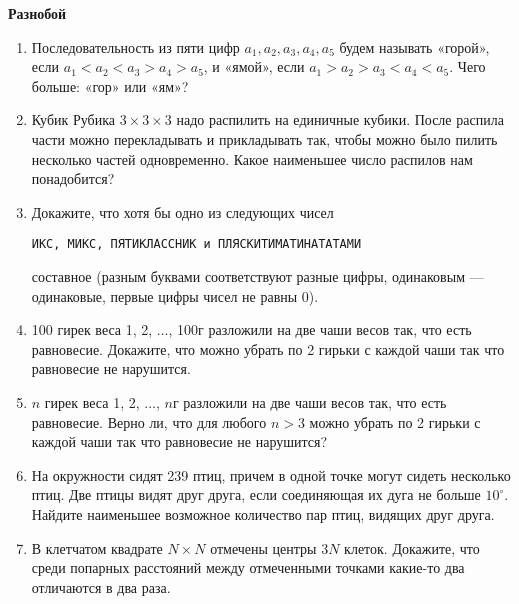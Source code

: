 \documentclass{article}
\begin{document}
\large
	

\begin{center}
\textbf{Разнобой}
\end{center}

\begin{enumerate}[label*=\protect\fbox{\arabic{enumi}}]
	
	\item Последовательность из пяти цифр $a_1, a_2, a_3, a_4, a_5$ будем называть «горой», если $a_1 < a_2 < a_3 > a_4 > a_5$, и «ямой», если $a_1 > a_2 > a_3 < a_4 < a_5$. Чего больше: «гор» или
	«ям»?
	
	\item Кубик Рубика $3 \times 3 \times 3$ надо распилить на единичные кубики. После распила части
	можно перекладывать и прикладывать так, чтобы можно было пилить несколько
	частей одновременно. Какое наименьшее число распилов нам понадобится?
	
	\item Докажите, что хотя бы одно из следующих чисел 
	\begin{center}
		 \texttt{ИКС, МИКС, ПЯТИКЛАССНИК и ПЛЯСКИТИМАТИНАТАТАМИ}
	\end{center}
	 составное (разным буквами соответствуют разные цифры, одинаковым — одинаковые, первые цифры чисел не равны 0).
	
	\item 100 гирек веса 1, 2, $\dotsc$, 100г разложили на две чаши весов так, что есть равновесие. Докажите, что можно убрать по 2 гирьки с каждой чаши так что равновесие не нарушится.
	
	\item $n$ гирек веса 1, 2, $\dotsc$, $n$г разложили на две чаши весов так, что есть равновесие. Верно ли, что для любого $n > 3$ можно убрать по 2 гирьки с каждой чаши так что равновесие не нарушится?
	
	\item На окружности сидят 239 птиц, причем в одной точке могут сидеть несколько птиц. Две птицы видят друг друга, если соединяющая их дуга не больше $10^\circ$. Найдите наименьшее возможное количество пар птиц, видящих друг друга.
	
	\item В клетчатом квадрате $N\times N$ отмечены центры $3N$ клеток. Докажите, что среди попарных расстояний между отмеченными точками какие-то два отличаются в два раза.
\end{enumerate}
\end{document}
